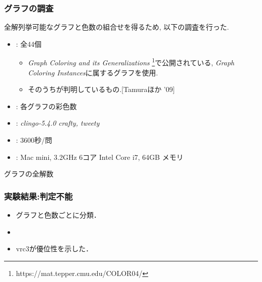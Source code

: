\begin{frame}\frametitle{グラフの調査}
  全解列挙可能なグラフと色数の組合せを得るため, 以下の調査を行った.
  \begin{itemize}
    \item {}: 全44個
    \begin{itemize}
      \item \textit{Graph Coloring and its Generalizations}
      \footnote{https://mat.tepper.cmu.edu/COLOR04/}で公開されている, \textit{Graph Coloring Instances}に属するグラフを使用.
      \item そのうちが判明しているもの.[Tamuraほか '09]
    \end{itemize}
    \item {}: 各グラフの彩色数

    \item {}: \textit{clingo-5.4.0} \textit{crafty, tweety}
    \item {}: 3600秒/問
    \item {}: Mac mini, 3.2GHz 6コア Intel Core i7, 64GB メモリ
  \end{itemize}
  
\end{frame}


\begin{frame}{グラフの全解数}
  \begin{table}[t]
    \centering
    
  \end{table}
\end{frame}


\begin{frame}\frametitle{実験結果:判定不能}
  
  \begin{table}[t]
    \centering
    
  \end{table}

  \begin{itemize}
    \item グラフと色数ごとに分類．
    \item {}
    \item vrc3が優位性を示した．
  \end{itemize}

\end{frame}

\backupend